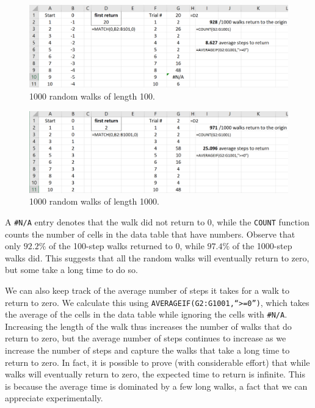 \begin{figure}[htbp!]
	\centering
	\includegraphics[width=\textwidth]{fig/3_randomwalk_3.png}
	\caption{1000 random walks of length 100. \label{fig:3_randomwalk_3}}
\end{figure}


\begin{figure}[htbp!]
	\centering
	\includegraphics[width=\textwidth]{fig/3_randomwalk_4.png}
	\caption{1000 random walks of length 1000. \label{fig:3_randomwalk_4}}
\end{figure}

A \texttt{\#N/A} entry denotes that the walk did not return to 0, while the \texttt{COUNT} function counts the number of cells in the data table that have numbers.
Observe that only $92.2\%$ of the 100-step walks returned to 0, while $97.4\%$ of the 1000-step walks did.
This suggests that all the random walks will eventually return to zero, but some take a long time to do so.

We can also keep track of the average number of steps it takes for a walk to return to zero.
We calculate this using \texttt{AVERAGEIF(G2:G1001,``>=0'')}, which takes the average of the cells in the data table while ignoring the cells with \texttt{\#N/A}.
Increasing the length of the walk thus increases the number of walks that do return to zero, but the average number of steps continues to increase as we increase the number of steps and capture the walks that take a long time to return to zero.
In fact, it is possible to prove (with considerable effort) that while walks will eventually return to zero, the expected time to return is infinite.
This is because the average time is dominated by a few long walks, a fact that we can appreciate experimentally.

